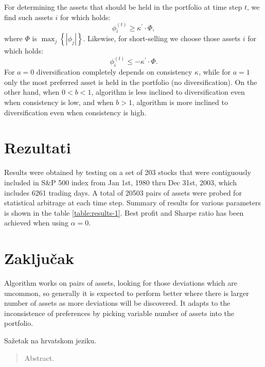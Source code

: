 \documentclass[lmodern, utf8, diplomski, numeric]{fer}
\begin{document}
  For determining the assets that should be held in the portfolio at time step $t$, we find such assets $i$ for which holds:
  \begin{equation}
  \phi_i^{(t)} \ge \kappa^\prime \cdot \Phi,
  \end{equation}
  where $\Phi$ is $\max_j \left\{ \left| \phi_j \right| \right\}$.
  Likewise, for short-selling we choose those assets $i$ for which holds:
  \begin{equation}
  \phi_i^{(t)} \le -\kappa^\prime \cdot \Phi.
  \end{equation}
  For $a = 0$ diversification completely depends on consistency $\kappa$, while for $a = 1$ only the most preferred asset is held in the portfolio (no diversification).
  On the other hand, when $0 < b < 1$, algorithm is less inclined to diversification even when consistency is low, and when $b > 1$, algorithm is more inclined to diversification even when consistency is high. 
  
  \chapter{Rezultati}
  
  Results were obtained by testing on a set of 203 stocks that were contiguously included in S\&P 500 index from Jan 1st, 1980 thru Dec 31st, 2003, which includes 6261 trading days.
  A total of 20503 pairs of assets were probed for statistical arbitrage at each time step.
  Summary of results for various parameters is shown in the table \ref{table:results-1}.
  Best profit and Sharpe ratio has been achieved when using $\alpha = 0$.
  
  

  \chapter{Zaključak}
  Algorithm works on pairs of assets, looking for those deviations which are uncommon, so generally it is expected to perform better where there is larger number of assets as more deviations will be discovered.
  It adapts to the inconsistence of preferences by picking variable number of assets into the portfolio.




\begin{sazetak}
Sažetak na hrvatskom jeziku.

\end{sazetak}

\begin{abstract}
Abstract.

\end{abstract}
\end{document}

